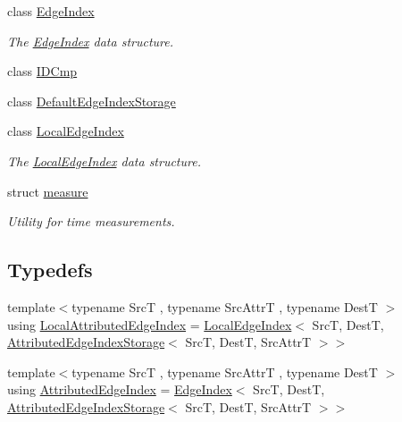 \begin{DoxyCompactItemize}
\item 
class \hyperlink{classshad_1_1EdgeIndex}{Edge\-Index}
\begin{DoxyCompactList}\small\item\em The \hyperlink{classshad_1_1EdgeIndex}{Edge\-Index} data structure. \end{DoxyCompactList}\item 
class \hyperlink{classshad_1_1IDCmp}{I\-D\-Cmp}
\item 
class \hyperlink{classshad_1_1DefaultEdgeIndexStorage}{Default\-Edge\-Index\-Storage}
\item 
class \hyperlink{classshad_1_1LocalEdgeIndex}{Local\-Edge\-Index}
\begin{DoxyCompactList}\small\item\em The \hyperlink{classshad_1_1LocalEdgeIndex}{Local\-Edge\-Index} data structure. \end{DoxyCompactList}\item 
struct \hyperlink{structshad_1_1measure}{measure}
\begin{DoxyCompactList}\small\item\em Utility for time measurements. \end{DoxyCompactList}\end{DoxyCompactItemize}
\subsection*{Typedefs}
\begin{DoxyCompactItemize}
\item 
{\footnotesize template$<$typename Src\-T , typename Src\-Attr\-T , typename Dest\-T $>$ }\\using \hyperlink{namespaceshad_a1c829d1964a31a103acef7260a679a67}{Local\-Attributed\-Edge\-Index} = \hyperlink{classshad_1_1LocalEdgeIndex}{Local\-Edge\-Index}$<$ Src\-T, Dest\-T, \hyperlink{classshad_1_1AttributedEdgeIndexStorage}{Attributed\-Edge\-Index\-Storage}$<$ Src\-T, Dest\-T, Src\-Attr\-T $>$$>$
\item 
{\footnotesize template$<$typename Src\-T , typename Src\-Attr\-T , typename Dest\-T $>$ }\\using \hyperlink{namespaceshad_a4fcdd0f79705e26acfcc087f7299e70e}{Attributed\-Edge\-Index} = \hyperlink{classshad_1_1EdgeIndex}{Edge\-Index}$<$ Src\-T, Dest\-T, \hyperlink{classshad_1_1AttributedEdgeIndexStorage}{Attributed\-Edge\-Index\-Storage}$<$ Src\-T, Dest\-T, Src\-Attr\-T $>$$>$
\end{DoxyCompactItemize}
